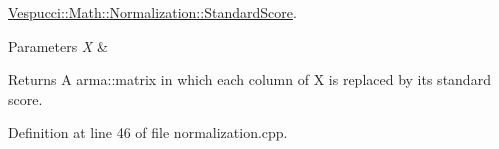 \hyperlink{namespace_vespucci_1_1_math_1_1_normalization_a8a39e3540561860b69ec95d8d33bfac0}{Vespucci\+::\+Math\+::\+Normalization\+::\+Standard\+Score}. 


\begin{DoxyParams}{Parameters}
{\em X} & \\
\hline
\end{DoxyParams}
\begin{DoxyReturn}{Returns}
A arma\+::matrix in which each column of X is replaced by its standard score. 
\end{DoxyReturn}


Definition at line 46 of file normalization.\+cpp.

